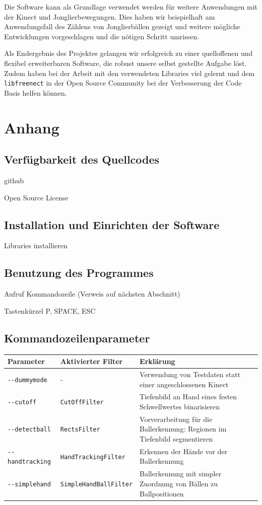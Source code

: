 \documentclass[12pt,a4paper,ngerman]{scrartcl}
\begin{document}
Die Software kann als Grundlage verwendet werden für weitere Anwendungen mit
der Kinect und Jonglierbewegungen. Dies haben wir beispielhaft am Anwendungsfall
des Zählens von Jonglierbällen gezeigt und weitere mögliche Entwicklungen
vorgeschlagen und die nötigen Schritt umrissen.

Als Endergebnis des Projektes gelangen wir erfolgreich zu einer quelloffenen und flexibel
erweiterbaren Software, die robust unsere selbst gestellte Aufgabe löst. Zudem haben
bei der Arbeit mit den verwendeten Libraries viel gelernt und dem
\lstinline{libfreenect} in der Open Source Community bei der Verbesserung der
Code Basis helfen können.




\newpage

\section{Anhang}

\subsection{Verfügbarkeit des Quellcodes}

github

Open Source License

\subsection{Installation und Einrichten der Software}

Libraries installieren

\subsection{Benutzung des Programmes}

Aufruf Kommandozeile (Verweis auf nächsten Abschnitt)

Tastenkürzel P, SPACE, ESC

\subsection{Kommandozeilenparameter}
\label{sec:parameter}

\begin{tabular}{llp{8cm}}
Parameter & Aktivierter Filter & Erklärung \\ \hline
{\lstinline!--dummymode!} & - & Verwendung von Testdaten statt einer angeschlossenen Kinect \\
{\lstinline!--cutoff!} & {\lstinline!CutOffFilter!} & Tiefenbild an Hand eines festen Schwellwertes binarisieren \\
{\lstinline!--detectball!} & {\lstinline!RectsFilter!} & Vorverarbeitung für die Ballerkennung: Regionen im Tiefenbild segmentieren \\
{\lstinline!--handtracking!} & {\lstinline!HandTrackingFilter!} & Erkennen der Hände vor der Ballerkennung \\
{\lstinline!--simplehand!} & {\lstinline!SimpleHandBallFilter!} & Ballerkennung mit simpler Zuordnung von Bällen zu Ballpositionen
\end{tabular}
\end{document}
